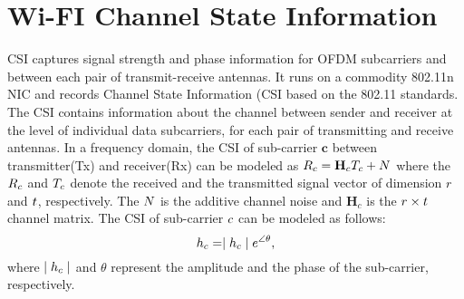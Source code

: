 \label{chp:Survey}
\iffalse
\section{ConvNets}
Convolutional Neural Networks is a special case of Multi Layer Perceptron and it has unified feature extractor and classifier in one network. It has been widely applied to visual objects such as image, video or 2D array input. Several factors make ConvNets attractive in image-related tasks.
Local connectivity captures local correlation property of the image. It is applicable by using ConvNet filter. Weight sharing helps to reduce the number of weights in feature maps.
Also, CUDA libraries make the training feature maps easier to reduce training time.
\fi
\section{Wi-FI Channel State Information}
CSI captures signal strength and phase information for OFDM subcarriers and between each pair of transmit-receive antennas.
It runs on a commodity 802.11n NIC and records Channel State Information (CSI based on the 802.11 standards.
The CSI contains information about the channel between sender and receiver at the level of individual data subcarriers, for each pair of transmitting and receive antennas.
In a frequency domain, the CSI of sub-carrier $\mathbf{c}$ between transmitter(Tx) and receiver(Rx) can be modeled as 
$\mathnormal{R}_{c} = \mathbf{H}_{c}\mathnormal{T}_{c} +\mathnormal{N}$ where the $\mathnormal{R}_{c}$ and $\mathnormal{T}_{c}$  denote the received and the transmitted signal vector of dimension $\mathnormal{r}$ and $\mathnormal{t}$, respectively. The $\mathnormal{N}$ is the additive channel noise and $\mathbf{H}_{c}$ is the $\mathnormal{r}\times\mathnormal{t}$ channel matrix. The CSI of sub-carrier $\mathnormal{c}$ can be modeled as follows:
\begin{equation}
    \mathnormal{h}_{c} = \mid\mathnormal{h}_{c}\mid\mathnormal{e}^{\angle\theta},
\end{equation}
where $\mid\mathnormal{h}_{c}\mid$ and $\theta$ represent the amplitude and the phase of the sub-carrier, respectively.
